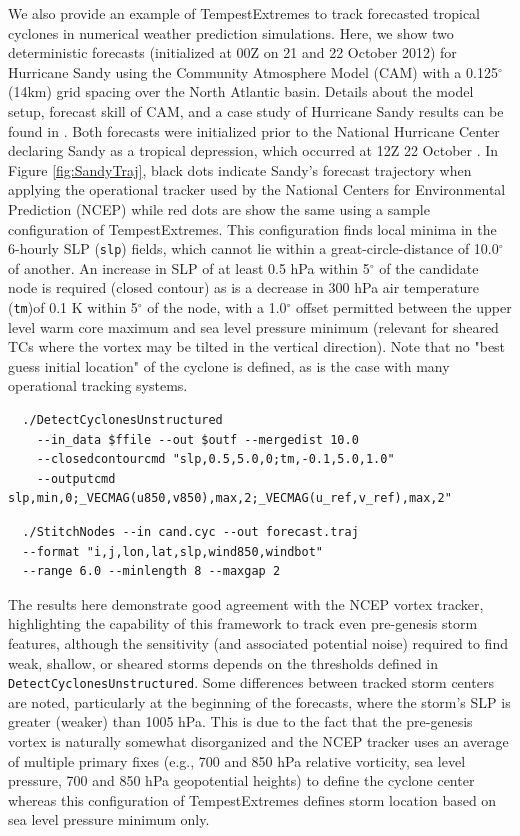 \documentclass[gmdd, hvmath]{copernicus}
\begin{document}
We also provide an example of TempestExtremes to track forecasted tropical cyclones in numerical weather prediction simulations. Here, we show two deterministic forecasts (initialized at 00Z on 21 and 22 October 2012) for Hurricane Sandy using the Community Atmosphere Model (CAM) with a 0.125$^\circ$ (14km) grid spacing over the North Atlantic basin. Details about the model setup, forecast skill of CAM, and a case study of Hurricane Sandy results can be found in \citet{Zarzycki2015TCForecast}. Both forecasts were initialized prior to the National Hurricane Center declaring Sandy as a tropical depression, which occurred at 12Z 22 October \citep{NHCSandy}. In Figure \ref{fig:SandyTraj}, black dots indicate Sandy's forecast trajectory when applying the operational tracker used by the National Centers for Environmental Prediction (NCEP) \citep{Marchok2002} while red dots are show the same using a sample configuration of TempestExtremes. This configuration finds local minima in the 6-hourly SLP (\texttt{slp}) fields, which cannot lie within a great-circle-distance of 10.0$^\circ$ of another. An increase in SLP of at least 0.5 hPa within 5$^\circ$ of the candidate node is required (closed contour) as is a decrease in 300 hPa air temperature (\texttt{tm})of 0.1 K within 5$^\circ$ of the node, with a 1.0$^\circ$ offset permitted between the upper level warm core maximum and sea level pressure minimum (relevant for sheared TCs where the vortex may be tilted in the vertical direction). Note that no "best guess initial location" of the cyclone is defined, as is the case with many operational tracking systems.

{\small \begin{verbatim}
  ./DetectCyclonesUnstructured
    --in_data $ffile --out $outf --mergedist 10.0
    --closedcontourcmd "slp,0.5,5.0,0;tm,-0.1,5.0,1.0"
    --outputcmd slp,min,0;_VECMAG(u850,v850),max,2;_VECMAG(u_ref,v_ref),max,2"
\end{verbatim}}

{\small \begin{verbatim}
  ./StitchNodes --in cand.cyc --out forecast.traj
  --format "i,j,lon,lat,slp,wind850,windbot"
  --range 6.0 --minlength 8 --maxgap 2
\end{verbatim}}

The results here demonstrate good agreement with the NCEP vortex tracker, highlighting the capability of this framework to track even pre-genesis storm features, although the sensitivity (and associated potential noise) required to find weak, shallow, or sheared storms depends on the thresholds defined in \texttt{DetectCyclonesUnstructured}. Some differences between tracked storm centers are noted, particularly at the beginning of the forecasts, where the storm's SLP is greater (weaker) than 1005 hPa. This is due to the fact that the pre-genesis vortex is naturally somewhat disorganized and the NCEP tracker uses an average of multiple primary fixes (e.g., 700 and 850 hPa relative vorticity, sea level pressure, 700 and 850 hPa geopotential heights) to define the cyclone center whereas this configuration of TempestExtremes defines storm location based on sea level pressure minimum only.
\end{document}
